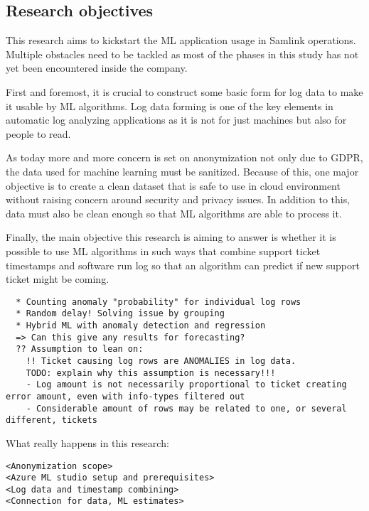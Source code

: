 

\subsection{Research objectives}\label{subsec:intro-research-objectives}
This research aims to kickstart the ML application usage in Samlink operations.
Multiple obstacles need to be tackled
as most of the phases in this study
has not yet been encountered inside the company.

First and foremost,
it is crucial to construct some basic form for log data
to make it usable by ML algorithms.
Log data forming is one of the key elements in automatic log analyzing applications
as it is not for just machines
but also for people to read.

As today more and more concern is set on anonymization
not only due to GDPR,
the data used for machine learning must be sanitized.
Because of this,
one major objective is to create a clean dataset
that is safe to use in cloud environment
without raising concern around security and privacy issues.
In addition to this,
data must also be clean enough
so that ML algorithms
are able to process it.

Finally,
the main objective this research is aiming to answer
is whether it is possible to use ML algorithms
in such ways that combine support ticket timestamps
and software run log
so that an algorithm can predict
if new support ticket might be coming.

\begin{verbatim}
  * Counting anomaly "probability" for individual log rows
  * Random delay! Solving issue by grouping
  * Hybrid ML with anomaly detection and regression
  => Can this give any results for forecasting?
  ?? Assumption to lean on:
    !! Ticket causing log rows are ANOMALIES in log data.
    TODO: explain why this assumption is necessary!!!
    - Log amount is not necessarily proportional to ticket creating error amount, even with info-types filtered out
    - Considerable amount of rows may be related to one, or several different, tickets
\end{verbatim}

What really happens in this research:
\begin{verbatim}
<Anonymization scope>
<Azure ML studio setup and prerequisites>
<Log data and timestamp combining>
<Connection for data, ML estimates>
\end{verbatim}

